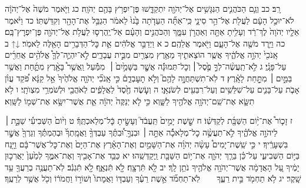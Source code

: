 \documentclass[twoside, openany, parskip=half, 11pt]{book}
\begin{document}
רָֽב׃ כב וְגַ֧ם הַכֹּהֲנִ֛ים הַנִּגָּשִׁ֥ים אֶל־יְהֹוָ֖ה יִתְקַדָּ֑שׁוּ פֶּן־יִפְרֹ֥ץ בָּהֶ֖ם יְהֹוָֽה׃ כג וַיֹּ֤אמֶר מֹשֶׁה֙ אֶל־יְהֹוָ֔ה לֹא־יוּכַ֣ל הָעָ֔ם לַעֲלֹ֖ת אֶל־הַ֣ר סִינָ֑י כִּֽי־אַתָּ֞ה הַעֵדֹ֤תָה בָּ֙נוּ֙ לֵאמֹ֔ר הַגְבֵּ֥ל אֶת־הָהָ֖ר וְקִדַּשְׁתּֽוֹ׃ כד וַיֹּ֨אמֶר אֵלָ֤יו יְהֹוָה֙ לֶךְ־רֵ֔ד וְעָלִ֥יתָ אַתָּ֖ה וְאַהֲרֹ֣ן עִמָּ֑ךְ וְהַכֹּהֲנִ֣ים וְהָעָ֗ם אַל־יֶֽהֶרְס֛וּ לַעֲלֹ֥ת אֶל־יְהֹוָ֖ה פֶּן־יִפְרׇץ־בָּֽם׃ כה וַיֵּ֥רֶד מֹשֶׁ֖ה אֶל־הָעָ֑ם וַיֹּ֖אמֶר אֲלֵהֶֽם׃
כ א וַיְדַבֵּ֣ר אֱלֹהִ֔ים אֵ֛ת כׇּל־הַדְּבָרִ֥ים הָאֵ֖לֶּה לֵאמֹֽר׃
↓↑ ב אָֽנֹכִ֖י֙ יְהֹוָ֣ה אֱלֹהֶ֑֔יךָ אֲשֶׁ֧ר הוֹצֵאתִ֛יךָ מֵאֶ֥רֶץ מִצְרַ֖יִם מִבֵּ֣֥ית עֲבָדִ֑‍ֽים׃ לֹֽ֣א־יִהְיֶ֥‍ֽה־לְךָ֛֩ אֱלֹהִ֥֨ים אֲחֵרִ֖֜ים עַל־פָּנָֽ֗יַ׃ ג לֹֽ֣א־תַֽעֲשֶׂ֨ה־לְךָ֥֣ פֶ֣֙סֶל֙ ׀ וְכׇל־תְּמוּנָ֔֡ה אֲשֶׁ֤֣ר בַּשָּׁמַ֣֙יִם֙ ׀  מִמַּ֔֡עַל וַֽאֲשֶׁ֥ר֩ בָּאָ֖֨רֶץ מִתַָּ֑֜חַת וַאֲשֶׁ֥ר בַּמַּ֖֣יִם ׀ מִתַּ֥֣חַת לָאָֽ֗רֶץ׃ ד לֹֽא־תִשְׁתַּחֲוֶ֥֣ה לָהֶ֖ם֮ וְלֹ֣א תׇעׇבְדֵ֑ם֒ כִּ֣י אָֽנֹכִ֞י יְהֹוָ֤ה אֱלֹהֶ֙יךָ֙ אֵ֣ל קַנָּ֔א פֹּ֠קֵד עֲוֺ֨ן אָבֹ֧ת עַל־בָּנִ֛ים עַל־שִׁלֵּשִׁ֥ים וְעַל־רִבֵּעִ֖ים לְשֹׂנְאָֽ֑י׃ ה וְעֹ֥֤שֶׂה חֶ֖֙סֶד֙ לַאֲלָפִ֑֔ים לְאֹהֲבַ֖י וּלְשֹׁמְרֵ֥י מִצְוֺתָֽי׃
ו לֹ֥א תִשָּׂ֛א אֶת־שֵֽׁם־יְהֹוָ֥ה אֱלֹהֶ֖יךָ לַשָּׁ֑וְא כִּ֣י לֹ֤א יְנַקֶּה֙ יְהֹוָ֔ה אֵ֛ת אֲשֶׁר־יִשָּׂ֥א אֶת־שְׁמ֖וֹ לַשָּֽׁוְא׃

ז זָכ֛וֹר֩ אֶת־י֥֨וֹם הַשַּׁבָּ֖֜ת לְקַדְּשֽׁ֗וֹ׃ ח שֵׁ֤֣שֶׁת יָמִ֣ים֙ תַּֽעֲבֹ֔ד֮ וְעָשִׂ֖֣יתָ כׇּֿל־מְלַאכְתֶּֽךָ֒׃ ט וְי֨וֹם֙ הַשְּׁבִיעִ֔֜י שַׁבָּ֖֣ת ׀ לַיהֹוָ֣ה אֱלֹהֶ֑֗יךָ לֹֽ֣א־תַעֲשֶׂ֣֨ה כׇל־מְלָאכָ֜֡ה אַתָּ֣ה ׀ וּבִנְךָ֣‍ֽ־וּ֠בִתֶּ֗ךָ עַבְדְּךָ֤֨ וַאֲמָֽתְךָ֜֙ וּבְהֶמְתֶּ֔֗ךָ וְגֵרְךָ֖֙ אֲשֶׁ֥֣ר בִּשְׁעָרֶֽ֔יךָ׃ י כִּ֣י שֵֽׁשֶׁת־יָמִים֩ עָשָׂ֨ה יְהֹוָ֜ה אֶת־הַשָּׁמַ֣יִם וְאֶת־הָאָ֗רֶץ אֶת־הַיָּם֙ וְאֶת־כׇּל־אֲשֶׁר־בָּ֔ם וַיָּ֖נַח בַּיּ֣וֹם הַשְּׁבִיעִ֑י עַל־כֵּ֗ן בֵּרַ֧ךְ יְהֹוָ֛ה אֶת־י֥וֹם הַשַּׁבָּ֖ת וַֽיְקַדְּשֵֽׁהוּ׃
יא כַּבֵּ֥ד אֶת־אָבִ֖יךָ וְאֶת־אִמֶּ֑ךָ לְמַ֙עַן֙ יַאֲרִכ֣וּן יָמֶ֔יךָ עַ֚ל הָאֲדָמָ֔ה אֲשֶׁר־יְהֹוָ֥ה אֱלֹהֶ֖יךָ נֹתֵ֥ן לָֽךְ׃
יב לֹ֥֖א תִּֿרְצָ֖‍ֽח׃
לֹ֣֖א תִּֿנְאָ֑‍ֽף׃
לֹ֣֖א תִּֿגְנֹֽ֔ב׃
לֹֽא־תַעֲנֶ֥ה בְרֵעֲךָ֖ עֵ֥ד שָֽׁקֶר׃
יג לֹ֥א תַחְמֹ֖ד בֵּ֣ית רֵעֶ֑ךָ  לֹֽא־תַחְמֹ֞ד אֵ֣שֶׁת רֵעֶ֗ךָ וְעַבְדּ֤וֹ וַאֲמָתוֹ֙ וְשׁוֹר֣וֹ וַחֲמֹר֔וֹ וְכֹ֖ל אֲשֶׁ֥ר לְרֵעֶֽךָ׃
\end{document}
